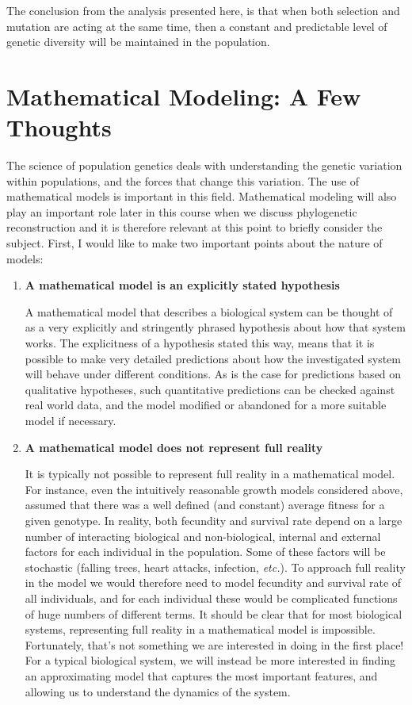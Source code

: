 \documentclass[11pt,a4paper]{book}
\begin{document}
The conclusion from the analysis presented here,  is that when both selection and mutation are acting at the same time, then a constant and predictable level of genetic diversity will be maintained in the population. 

\section{Mathematical Modeling: A Few Thoughts\label{SUBSECmathmodel}}

The science of population genetics deals with understanding the genetic variation within populations, and the forces that change this variation.  The use of mathematical models is important in this field. Mathematical modeling will also play an important role later in this course when we discuss phylogenetic reconstruction and it is therefore relevant at this point to briefly consider the subject. First, I would like to make two important points about the nature of models:\\

\begin{enumerate}

\item {\bf A mathematical model is an explicitly stated hypothesis}

A mathematical model that describes a biological system can be thought of as a very explicitly and stringently  phrased hypothesis about how that system works. The explicitness of a hypothesis stated this way, means that it is possible to make very detailed predictions about how the investigated system will behave under different conditions. As is the case for predictions based on qualitative hypotheses, such quantitative predictions can be checked against real world data, and the model modified or abandoned for a more suitable model if necessary.

\item {\bf A mathematical model does not represent full reality}

It is typically not possible to represent full reality in a mathematical model. For instance, even the intuitively reasonable growth models considered above, assumed that there was a well defined (and constant) average fitness for a given genotype. In reality, both fecundity and survival rate depend on a large number of interacting biological and non-biological, internal and external factors for each individual in the population. Some of these factors will be stochastic (falling trees, heart attacks, infection, \emph{etc.}). To approach full reality in the model we would therefore need to model fecundity and survival rate of all individuals, and for each individual these would be complicated functions of huge numbers of different terms. It should be clear that for most biological systems, representing full reality in a mathematical model is impossible. Fortunately, that's not something we are interested in doing in the first place! For a typical biological system, we will instead be more interested in finding an approximating model that captures the most important features, and allowing us to understand the dynamics of the system.

\end{enumerate}
\end{document}
